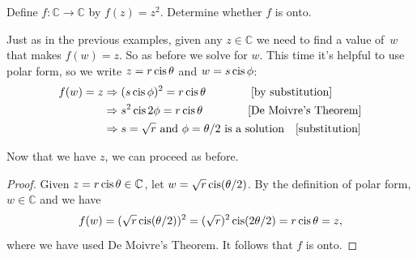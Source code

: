 \begin{example}{}
Define $f \colon \mathbb{C} \to \mathbb{C}$ by $f(z) = z^2$. Determine whether $f$ is onto.


\begin{scratchwork}
Just as in the previous examples, given any $z \in \mathbb{C}$  we need to find a value of~$w$ that makes $f(w) = z$. So as before we solve for $w$. This time it's helpful to use polar form, so we write $z = r \operatorname{cis} \theta$
and $w = s \operatorname{cis} \phi$:
\begin{align*}
f(w) = z  &\Rightarrow (s \operatorname{cis} \phi)^2 = r \operatorname{cis} \theta \qquad \qquad \text{[by substitution]}\\
 & \Rightarrow s^2 \operatorname{cis} 2\phi = r \operatorname{cis} \theta\qquad \qquad \text{[De Moivre's Theorem]}\\
& \Rightarrow s = \sqrt{r} \text{ and } \phi = \theta/2 \text{ is a solution} \quad \text{[substitution]}
\end{align*}

\noindent
Now that we have $z$, we can proceed as before.
\end{scratchwork}

\begin{proof} 
Given $z= r \operatorname{cis} \theta  \in \mathbb{C}$, let $w = \sqrt{r} \operatorname{cis} (\theta/2)$. By the definition of polar form, $w \in  \mathbb{C}$ and we have
\[ f(w) =  (\sqrt{r} \operatorname{cis} (\theta/2) )^2  = (\sqrt{r})^2 \operatorname{cis} (2\theta/2) = r \operatorname{cis} \theta = z, \]
where we have used De Moivre's Theorem. It follows that $f$ is onto.
\end{proof}
\end{example}



% 

